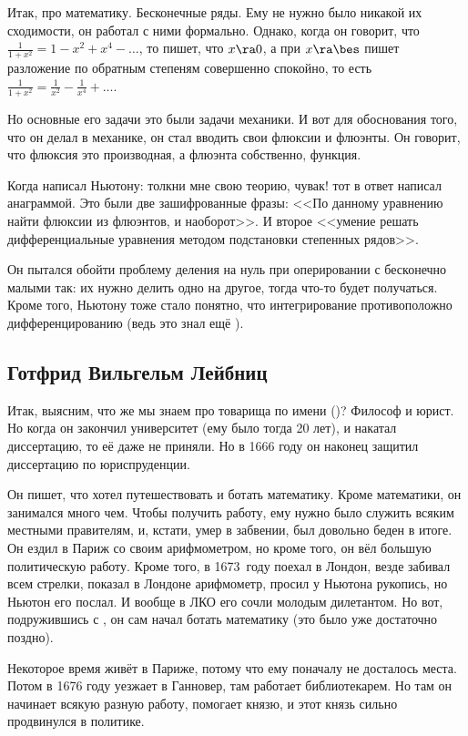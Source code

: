 \documentclass[a4paper,oneside,fleqn,10pt]{article}
\begin{document}
Итак, про математику. Бесконечные ряды. Ему не нужно было никакой их сходимости, он работал
с ними формально. Однако, когда он говорит, что $\frac{1}{1+x^2} = 1 - x^2 + x^4-\dots$,
то пишет, что $x \ra 0$, а при $x \ra \bes$ пишет разложение по обратным степеням
совершенно спокойно, то есть $\frac{1}{1+x^2} = \frac{1}{x^2} - \frac{1}{x^4} + \dots$.

Но основные его задачи это были задачи механики. И вот для обоснования того,
что он делал в механике, он стал вводить свои флюксии и флюэнты.
Он говорит, что флюксия это производная, а флюэнта собственно, функция.

Когда  написал Ньютону: толкни мне свою теорию, чувак! тот в ответ написал анаграммой.
Это были две зашифрованные фразы: <<По данному уравнению найти флюксии из флюэнтов, и наоборот>>.
И второе <<умение решать дифференциальные уравнения методом подстановки степенных рядов>>.

Он пытался обойти проблему деления на нуль при оперировании с бесконечно малыми
так: их нужно делить одно на другое, тогда что-то будет
получаться. Кроме того, Ньютону тоже стало понятно, что интегрирование противоположно
дифференцированию (ведь это знал ещё ).

\subsection{Готфрид Вильгельм Лейбниц}

Итак, выясним, что же мы знаем про товарища по имени  ()?
Философ и юрист. Но когда он закончил университет (ему было тогда 20 лет),
и накатал диссертацию, то её даже не приняли. Но в 1666 году он наконец
защитил диссертацию по юриспруденции.

Он пишет, что хотел путешествовать и ботать математику. Кроме математики,
он занимался много чем. Чтобы получить работу, ему нужно было служить всяким
местными правителям, и, кстати, умер в забвении, был довольно беден в итоге.
Он ездил в Париж со своим арифмометром, но кроме того, он вёл большую политическую
работу. Кроме того, в 1673~году поехал в Лондон, везде забивал всем стрелки,
показал в Лондоне арифмометр, просил у Ньютона рукопись, но Ньютон его послал.
И вообще в ЛКО его сочли молодым дилетантом. Но вот, подружившись с ,
он сам начал ботать математику (это было уже достаточно поздно).

Некоторое время живёт в Париже, потому что ему поначалу не досталось места.
Потом в 1676 году уезжает в Ганновер, там работает библиотекарем.
Но там он начинает всякую разную работу, помогает князю, и этот князь
сильно продвинулся в политике.
\end{document}
